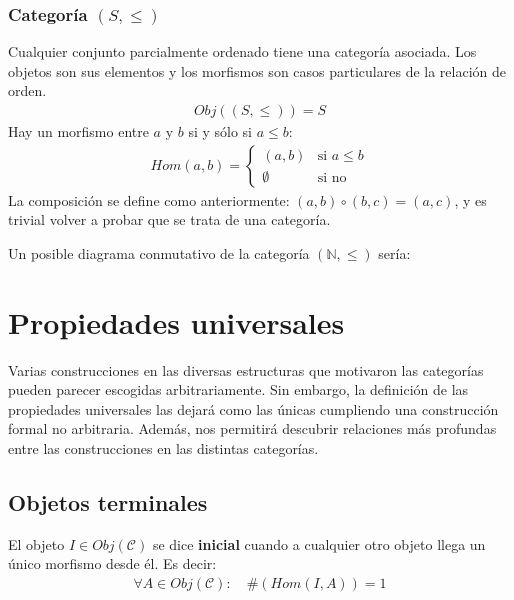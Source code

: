 \documentclass[11pt, fleqn, spanish]{book}
\newcommand{\C}{\mathcal{C} }
\newcommand{\twopartdef}[4]
{
	\left\{
		\begin{array}{ll}
			#1 & \mbox{si } #2 \\
			#3 & \mbox{si } #4
		\end{array}
	\right.
}
\begin{document}
    \subsection{Categoría \texttt{$(S,\leq)$}}
      Cualquier conjunto parcialmente ordenado tiene una categoría asociada. Los objetos
      son sus elementos y los morfismos son casos particulares de la relación de orden.
      \begin{gather*}
        Obj((S,\leq)) = S
      \end{gather*}
      Hay un morfismo entre $a$ y $b$ si y sólo si $a \leq b$:
      \begin{align*}
        Hom(a,b)= \twopartdef{(a,b)}{a \leq b}{\emptyset}{\mbox{no}}
      \end{align*}
      La composición se define como anteriormente: $(a,b) \circ (b,c) = (a,c)$, y es
      trivial volver a probar que se trata de una categoría.
      \medskip
      
      Un posible diagrama conmutativo de la categoría \texttt{$(\mathbb{N},\leq)$} sería:
      \begin{center}
      \end{center}
 

\chapter{Propiedades universales}
  Varias construcciones en las diversas estructuras que motivaron las categorías pueden parecer
  escogidas arbitrariamente. Sin embargo, la definición de las propiedades universales las dejará
  como las únicas cumpliendo una construcción formal no arbitraria. Además, nos permitirá descubrir
  relaciones más profundas entre las construcciones en las distintas categorías.
  
  \section {Objetos terminales}
    \begin{definition}
      El objeto $I \in Obj(\C)$ se dice \textbf{inicial} cuando a cualquier otro objeto llega
      un único morfismo desde él. Es decir:
      \begin{gather*}
	\forall A \in Obj(\C):\quad \#(Hom(I,A)) = 1
      \end{gather*}
    \end{definition}
 
\end{document}
